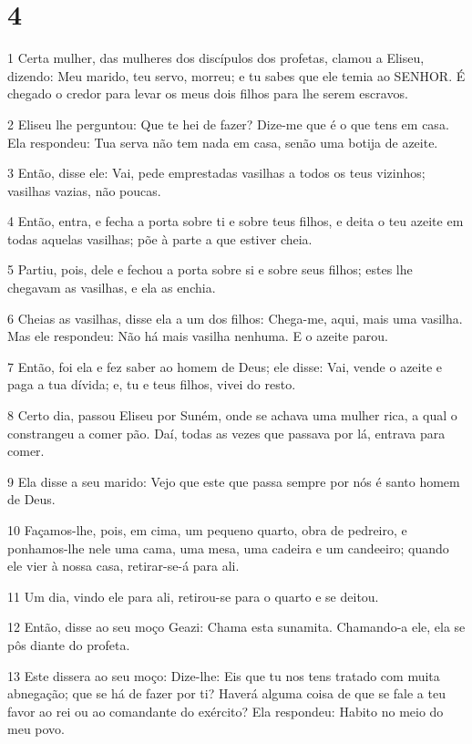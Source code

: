 \chapter{4}

\par 1 Certa mulher, das mulheres dos discípulos dos profetas, clamou a Eliseu, dizendo: Meu marido, teu servo, morreu; e tu sabes que ele temia ao SENHOR. É chegado o credor para levar os meus dois filhos para lhe serem escravos.
\par 2 Eliseu lhe perguntou: Que te hei de fazer? Dize-me que é o que tens em casa. Ela respondeu: Tua serva não tem nada em casa, senão uma botija de azeite.
\par 3 Então, disse ele: Vai, pede emprestadas vasilhas a todos os teus vizinhos; vasilhas vazias, não poucas.
\par 4 Então, entra, e fecha a porta sobre ti e sobre teus filhos, e deita o teu azeite em todas aquelas vasilhas; põe à parte a que estiver cheia.
\par 5 Partiu, pois, dele e fechou a porta sobre si e sobre seus filhos; estes lhe chegavam as vasilhas, e ela as enchia.
\par 6 Cheias as vasilhas, disse ela a um dos filhos: Chega-me, aqui, mais uma vasilha. Mas ele respondeu: Não há mais vasilha nenhuma. E o azeite parou.
\par 7 Então, foi ela e fez saber ao homem de Deus; ele disse: Vai, vende o azeite e paga a tua dívida; e, tu e teus filhos, vivei do resto.
\par 8 Certo dia, passou Eliseu por Suném, onde se achava uma mulher rica, a qual o constrangeu a comer pão. Daí, todas as vezes que passava por lá, entrava para comer.
\par 9 Ela disse a seu marido: Vejo que este que passa sempre por nós é santo homem de Deus.
\par 10 Façamos-lhe, pois, em cima, um pequeno quarto, obra de pedreiro, e ponhamos-lhe nele uma cama, uma mesa, uma cadeira e um candeeiro; quando ele vier à nossa casa, retirar-se-á para ali.
\par 11 Um dia, vindo ele para ali, retirou-se para o quarto e se deitou.
\par 12 Então, disse ao seu moço Geazi: Chama esta sunamita. Chamando-a ele, ela se pôs diante do profeta.
\par 13 Este dissera ao seu moço: Dize-lhe: Eis que tu nos tens tratado com muita abnegação; que se há de fazer por ti? Haverá alguma coisa de que se fale a teu favor ao rei ou ao comandante do exército? Ela respondeu: Habito no meio do meu povo.
